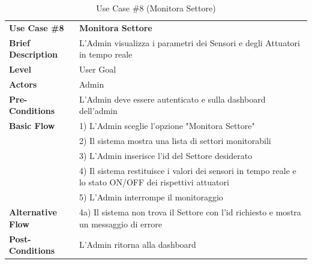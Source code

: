 \documentclass{article}
\begin{document}
\begin{table}[p]
    \begin{tabularx}{\textwidth}{ | l  X | }
        \rowcolor{lightgray!70}
        \hline
        \textbf{Use Case \#8} & \textbf{Monitora Settore }\\[0.5ex]
        \textbf{Brief Description} & L'Admin visualizza i parametri dei Sensori e degli Attuatori in tempo reale \\
        \rowcolor{blue!10}
        \textbf{Level} & User Goal \\
        \textbf{Actors} & Admin \\
        \rowcolor{blue!10}
        \textbf{Pre-Conditions} & L'Admin deve essere autenticato e sulla dashboard dell'admin\\
        \textbf{Basic Flow} & 1) L'Admin sceglie l'opzione "Monitora Settore"\\
        & 2) Il sistema mostra una lista di settori monitorabili\\
        & 3) L'Admin inserisce l'id del Settore desiderato\\
        & 4) Il sistema restituisce i valori dei sensori in tempo reale e lo stato ON/OFF dei rispettivi attuatori\\
        & 5) L'Admin interrompe il monitoraggio\\
        \rowcolor{blue!10}
        \textbf{Alternative Flow} & 4a) Il sistema non trova il Settore con l'id richiesto e mostra un messaggio di errore\\
        \textbf{Post-Conditions} & L'Admin ritorna alla dashboard \\
        \hline
    \end{tabularx}
    \caption{Use Case \#8 (Monitora Settore)}
\end{table} 
\end{document}
